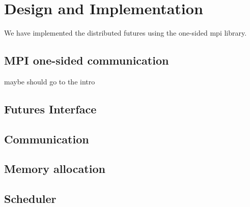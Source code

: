 \chapter{Design and Implementation}

	We have implemented the distributed futures using the one-sided mpi library.  

\section{MPI one-sided communication}
maybe should go to the intro

\section{Futures Interface}

\section{Communication}

\section{Memory allocation}

\section{Scheduler}
